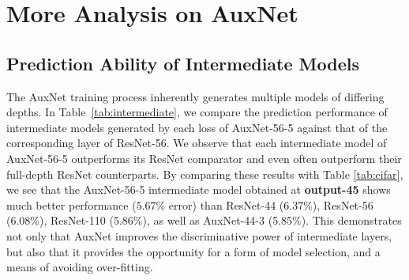 \documentclass[10pt,onecolumn,letterpaper]{article}
\def\SexyName{AuxNet\xspace}
\begin{document}
\section{More Analysis on \SexyName}\label{sec:analysis}



\subsection{Prediction Ability of Intermediate Models}\label{exp:inter_models}
The \SexyName training process inherently generates multiple models of differing depths.
In Table~\ref{tab:intermediate}, we compare the prediction performance of intermediate models generated by each loss of \SexyName-56-5
against that of the corresponding layer of ResNet-56. We observe that each intermediate model of \SexyName-56-5 outperforms its ResNet comparator and even often outperform their full-depth ResNet counterparts.
By comparing these results with Table \ref{tab:cifar}, we see that
the \SexyName-56-5 intermediate model obtained at \textbf{output-45} shows much better performance ($5.67\%$ error)
than ResNet-44 (6.37\%), ResNet-56 (6.08\%), ResNet-110 (5.86\%), as well as \SexyName-44-3 (5.85\%).
This demonstrates not only that \SexyName improves the discriminative power of intermediate layers, but also that it provides the opportunity for a form of model selection, and a means of avoiding over-fitting.
\end{document}
